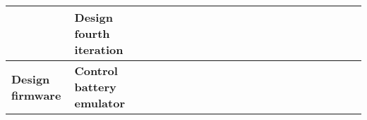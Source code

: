 \begin{table}[ht!]
\begin{tabular}{lp{2.5in}|llllllllllllllllllll|}
    \multicolumn{1}{|l|}{\cellcolor[HTML]{00E2FF}\textbf{}}                & \cellcolor[HTML]{00E2FF}\textbf{Design fourth iteration}                   & \multicolumn{1}{l|}{}                                   & \multicolumn{1}{l|}{}                                   & \multicolumn{1}{l|}{}                                   & \multicolumn{1}{l|}{}                                   & \multicolumn{1}{l|}{}                                   & \multicolumn{1}{l|}{}                                   & \multicolumn{1}{l|}{}                                   & \multicolumn{1}{l|}{}                                   & \multicolumn{1}{l|}{}                                   & \multicolumn{1}{l|}{}                                    & \multicolumn{1}{l|}{}                                    & \multicolumn{1}{l|}{}                                    & \multicolumn{1}{l|}{}                                    & \multicolumn{1}{l|}{\cellcolor[HTML]{F8A102}}            & \multicolumn{1}{l|}{\cellcolor[HTML]{F8A102}}            & \multicolumn{1}{l|}{\cellcolor[HTML]{F8A102}}            & \multicolumn{1}{l|}{}                                    & \multicolumn{1}{l|}{}                                    & \multicolumn{1}{l|}{}                                    &             \\ \hline
    \multicolumn{1}{|l|}{\cellcolor[HTML]{00E2FF}\textbf{Design firmware}} & \cellcolor[HTML]{00E2FF}\textbf{Control battery emulator}                  & \multicolumn{1}{l|}{}                                   & \multicolumn{1}{l|}{}                                   & \multicolumn{1}{l|}{}                                   & \multicolumn{1}{l|}{}                                   & \multicolumn{1}{l|}{}                                   & \multicolumn{1}{l|}{}                                   & \multicolumn{1}{l|}{}                                   & \multicolumn{1}{l|}{\cellcolor[HTML]{F8A102}}           & \multicolumn{1}{l|}{\cellcolor[HTML]{F8A102}}           & \multicolumn{1}{l|}{\cellcolor[HTML]{F8A102}}            & \multicolumn{1}{l|}{}                                    & \multicolumn{1}{l|}{}                                    & \multicolumn{1}{l|}{}                                    & \multicolumn{1}{l|}{}                                    & \multicolumn{1}{l|}{}                                    & \multicolumn{1}{l|}{}                                    & \multicolumn{1}{l|}{}                                    & \multicolumn{1}{l|}{}                                    & \multicolumn{1}{l|}{}                                    &             \\ \hline

\end{tabular}
\end{table}
